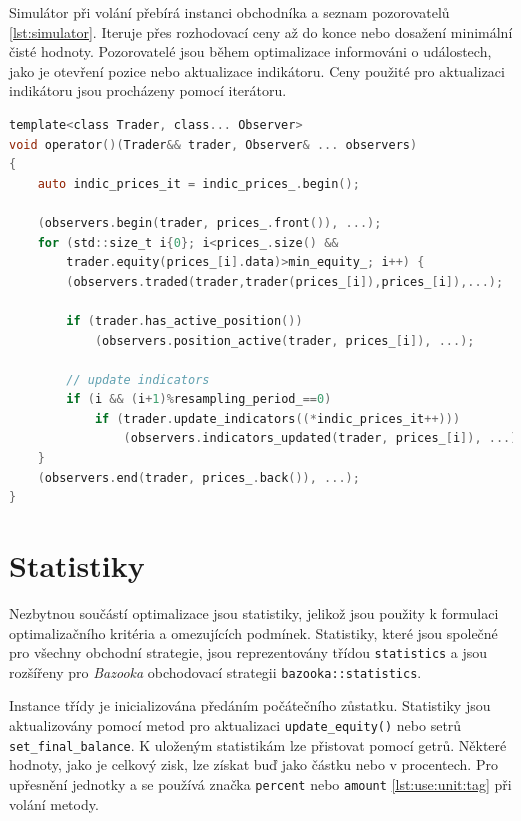 Simulátor při volání přebírá instanci obchodníka a seznam pozorovatelů \ref{lst:simulator}.
Iteruje přes rozhodovací ceny až do konce nebo dosažení minimální čisté hodnoty.
Pozorovatelé jsou během optimalizace informováni o událostech, jako je otevření pozice nebo aktualizace indikátoru.
Ceny použité pro aktualizaci indikátoru jsou procházeny pomocí iterátoru.

\begin{lstlisting}[caption={~Implementace simulace obchodování},label={lst:simulator},captionpos=t,abovecaptionskip=-\medskipamount,belowcaptionskip=\medskipamount,language=C]
template<class Trader, class... Observer>
void operator()(Trader&& trader, Observer& ... observers)
{
    auto indic_prices_it = indic_prices_.begin();

    (observers.begin(trader, prices_.front()), ...);
    for (std::size_t i{0}; i<prices_.size() &&
        trader.equity(prices_[i].data)>min_equity_; i++) {
        (observers.traded(trader,trader(prices_[i]),prices_[i]),...);

        if (trader.has_active_position())
            (observers.position_active(trader, prices_[i]), ...);

        // update indicators
        if (i && (i+1)%resampling_period_==0)
            if (trader.update_indicators((*indic_prices_it++)))
                (observers.indicators_updated(trader, prices_[i]), ...);
    }
    (observers.end(trader, prices_.back()), ...);
}
\end{lstlisting}

\section{Statistiky}
Nezbytnou součástí optimalizace jsou statistiky, jelikož jsou použity k formulaci optimalizačního kritéria a omezujících podmínek.
Statistiky, které jsou společné pro všechny obchodní strategie, jsou reprezentovány třídou \texttt{statistics} a jsou rozšířeny pro \textit{Bazooka} obchodovací strategii \texttt{bazooka::statistics}.

Instance třídy je inicializována předáním počátečního zůstatku.
Statistiky jsou aktualizovány pomocí metod pro aktualizaci \texttt{update\_equity()} nebo setrů \texttt{set\_final\_balance}.
K uloženým statistikám lze přistovat pomocí getrů.
Některé hodnoty, jako je celkový zisk, lze získat buď jako částku nebo v procentech.
Pro upřesnění jednotky a se používá značka \texttt{percent} nebo \texttt{amount} \ref{lst:use:unit:tag} při volání metody.


